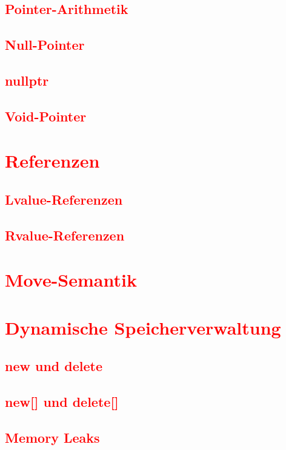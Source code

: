 \subsection{\textcolor{red}{Pointer-Arithmetik}}\label{sec:pointer-arithmetic}
\subsection{\textcolor{red}{Null-Pointer}}\label{sec:null-pointer}
\subsection{\textcolor{red}{nullptr}}\label{sec:nullptr}
\subsection{\textcolor{red}{Void-Pointer}}\label{sec:void-pointer}
\section{\textcolor{red}{Referenzen}}\label{sec:references}
\subsection{\textcolor{red}{Lvalue-Referenzen}}\label{sec:lvalue-references}
\subsection{\textcolor{red}{Rvalue-Referenzen}}\label{sec:rvalue-references}
\section{\textcolor{red}{Move-Semantik}}\label{sec:move-semantics}
\section{\textcolor{red}{Dynamische Speicherverwaltung}}\label{sec:dynamic-memory}
\subsection{\textcolor{red}{new und delete}}\label{sec:new-delete}
\subsection{\textcolor{red}{new[] und delete[]}}\label{sec:new-delete-array}
\subsection{\textcolor{red}{Memory Leaks}}\label{sec:memory-leaks}
